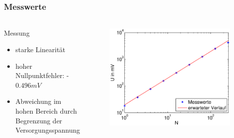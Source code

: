 \begin{frame}
    \frametitle{Messwerte}
    \framesubtitle{}
    \begin{columns}[c]
            \begin{block}{Messung}
                \begin{itemize}
                    \item starke Linearität
                    \item hoher Nullpunktfehler: -$0.496mV$
                    \item Abweichung im hohen Bereich durch Begrenzung der
                    Versorgungsspannung
                \end{itemize}
            \end{block}
            \begin{figure}[H]
            \begin{center}
                    \includegraphics[scale=0.3]{./img/graph/Aufgabe1b.eps}
            \end{center}
            \end{figure}
    \end{columns}
\end{frame}

